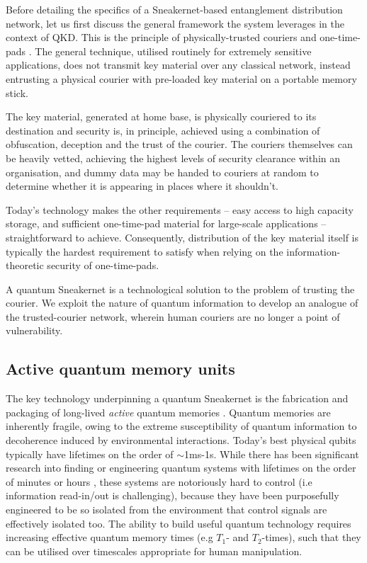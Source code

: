 \documentclass[twocolumn, aps, rmp, amsmath, amssymb, nofootinbib, superscriptaddress, longbibliography, floatfix, table-of-contents, eqsecnum]{revtex4-2}
\begin{document}
Before detailing the specifics of a Sneakernet-based entanglement distribution network, let us first discuss the general framework the system leverages in the context of QKD. This is the principle of physically-trusted couriers \cite{SD-Merkle:1978:SCO:359460.359473} and one-time-pads \cite{SD-Shannon:1949aa}. The general technique, utilised routinely for extremely sensitive applications, does not transmit key material over any classical network, instead entrusting a physical courier with pre-loaded key material on a portable memory stick. 

The key material, generated at home base, is physically couriered to its destination and security is, in principle, achieved using a combination of obfuscation, deception and the trust of the courier. The couriers themselves can be heavily vetted, achieving the highest levels of security clearance within an organisation, and dummy data may be handed to couriers at random to determine whether it is appearing in places where it shouldn't. 

Today's technology makes the other requirements -- easy access to high capacity storage, and sufficient one-time-pad material for large-scale applications -- straightforward to achieve. Consequently, distribution of the key material itself is typically the hardest requirement to satisfy when relying on the information-theoretic security of one-time-pads.

A quantum Sneakernet is a technological solution to the problem of trusting the courier. We exploit the nature of quantum information to develop an analogue of the trusted-courier network, wherein human couriers are no longer a point of vulnerability. 

\subsection{Active quantum memory units}

The key technology underpinning a quantum Sneakernet is the fabrication and packaging of long-lived \textit{active} quantum memories \cite{SD-Terhal:2015aa}. Quantum memories are inherently fragile, owing to the extreme susceptibility of quantum information to decoherence induced by environmental interactions. Today's best physical qubits typically have lifetimes on the order of $\sim$1ms-1s. While there has been significant research into finding or engineering quantum systems with lifetimes on the order of minutes or hours \cite{SD-Zhong:2015aa,SD-Rancic:2017aa,SD-Astner:2018aa}, these systems are notoriously hard to control (i.e information read-in/out is challenging), because they have been purposefully engineered to be so isolated from the environment that control signals are effectively isolated too. The ability to build useful quantum technology requires increasing effective quantum memory times (e.g $T_1$- and $T_2$-times), such that they can be utilised over timescales appropriate for human manipulation. 
\end{document}
